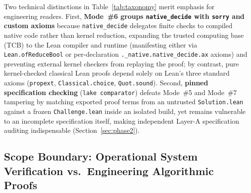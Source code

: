 \documentclass[11pt,letterpaper]{article}
\begin{document}
Two technical distinctions in Table~\ref{tab:taxonomy} merit emphasis for engineering readers. First, \textbf{Mode~\#6 groups \texttt{native\_decide} with \texttt{sorry} and custom axioms} because \texttt{native\_decide} delegates finite checks to compiled native code rather than kernel reduction, expanding the trusted computing base (TCB) to the Lean compiler and runtime (manifesting either via \texttt{Lean.ofReduceBool} or per-declaration \texttt{.\_native.native\_decide.ax} axioms) and preventing external kernel checkers from replaying the proof; by contrast, pure kernel-checked classical Lean proofs depend solely on Lean's three standard axioms (\texttt{propext}, \texttt{Classical.choice}, \texttt{Quot.sound}). Second, \textbf{pinned specification checking} (\texttt{lake comparator}) defeats Mode~\#5 and Mode~\#7 tampering by matching exported proof terms from an untrusted \texttt{Solution.lean} against a frozen \texttt{Challenge.lean} inside an isolated build, yet remains vulnerable to an incomplete specification itself, making independent Layer-A specification auditing indispensable (Section~\ref{sec:phase2}).

\subsection{Scope Boundary: Operational System Verification vs.\ Engineering Algorithmic Proofs}
\label{sec:opfv_boundary}
\end{document}
